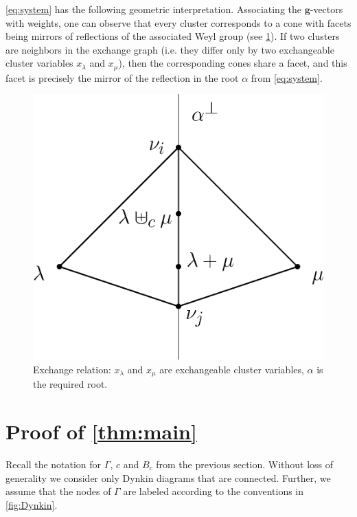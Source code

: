 \documentclass[pdftex]{sigma}
\numberwithin{equation}{section}
\numberwithin{figure}{section}
\newcommand{\bg}{\mathbf{g}}
\begin{document}
  \begin{Remark}
    \label{geom}
    \cref{eq:system} has the following geometric interpretation.
    Associating the $\bg$-vectors with weights, one can observe that every cluster corresponds to a cone with facets being mirrors of reflections of the associated Weyl group (see \cref{fig:exchange_relation}).
    If two clusters are neighbors in the exchange graph (i.e. they differ only by two exchangeable cluster variables $x_\lambda$ and $x_\mu$), then the corresponding cones share a facet, and this facet is precisely the mirror of the reflection in the root $\alpha$ from \cref{eq:system}.
   \begin{figure}[ht]
      \begin{center}
        \includegraphics[scale=0.4]{cones-section.eps}
      \end{center}
      \caption{Exchange relation: $x_\lambda$ and $x_\mu$ are exchangeable cluster variables, $\alpha$ is the required root.}
      \label{fig:exchange_relation}
    \end{figure}
\end{Remark}

\section{Proof of \cref{thm:main}}
\label{proof}
  Recall the notation for $\Gamma$, $c$ and $B_c$ from the previous section.
  Without loss of generality we consider only Dynkin diagrams that are connected.
  Further, we assume that the nodes of $\Gamma$ are labeled according to the conventions in \cref{fig:Dynkin}.
\end{document}
